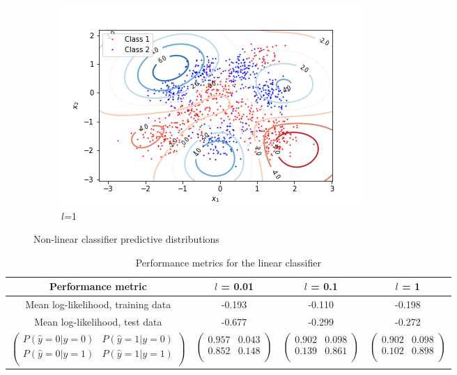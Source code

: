 \documentclass[a4paper]{article}
\begin{document}
\begin{figure}[h!]
\begin{subfigure}{0.32\textwidth}
            \centering
            \includegraphics[width=\textwidth]{plots/predictive_distribution_nonlinear_w=1.png}
            \caption{$l$=1}
        \end{subfigure}
        \label{fig:nonlinear_predictive_distributions}
        \caption{Non-linear classifier predictive distributions}
    \end{figure}

    \begin{table}[h!]
        \label{tab:performance_metrics_nonlinear}
        \centering
        \begin{tabular}{c|c|c|c}
            \textbf{Performance metric} & \textbf{$l$ = 0.01} & \textbf{$l$ = 0.1} & \textbf{$l$ = 1}\\
            \hline
            Mean log-likelihood, training data & -0.193 & -0.110 & -0.198 \\
            Mean log-likelihood, test data & -0.677 & -0.299 & -0.272 \\
            $\begin{pmatrix}
                 P(\hat{y}=0 | y=0) & P(\hat{y}=1 | y=0) \\
                 P(\hat{y}=0 | y=1) & P(\hat{y}=1 | y=1) \\
            \end{pmatrix}$ &
            $\begin{pmatrix}
                0.957 & 0.043 \\
                0.852 & 0.148 \\
            \end{pmatrix}$ &
            $\begin{pmatrix}
                0.902 & 0.098 \\
                0.139 & 0.861 \\
            \end{pmatrix}$ &
            $\begin{pmatrix}
                0.902 & 0.098 \\
                0.102 & 0.898 \\
            \end{pmatrix}$ \\
        \end{tabular}
        \caption{Performance metrics for the linear classifier}
    \end{table}
\end{document}
